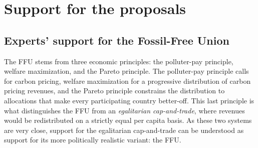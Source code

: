 \documentclass[12pt,english]{article}
\begin{document}
\clearpage

\section{Support for the proposals\label{sec:support}}

\subsection{Experts' support for the Fossil-Free Union\label{subsec:expert_support}}

The FFU stems from three economic principles: the polluter-pay principle, welfare maximization, and the Pareto principle. The polluter-pay principle calls for carbon pricing, welfare maximization for a progressive distribution of carbon pricing revenues, and the Pareto principle constrains the distribution to allocations that make every participating country better-off. This last principle is what distinguishes the FFU from an \textit{egalitarian cap-and-trade}, where revenues would be redistributed on a strictly equal per capita basis. As these two systems are very close, support for the egalitarian cap-and-trade can be understood as support for its more politically realistic variant: the FFU. 
\end{document}
